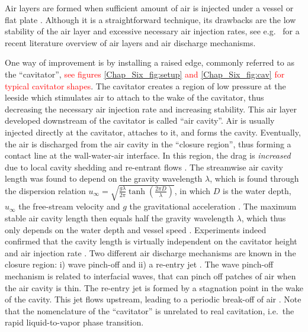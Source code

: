 \documentclass[aps,onecolumn,10pt, floatfix, superscriptaddress,longbibliography, pra]{revtex4-1}
\newcommand{\red}[1]{\textcolor{red}{#1}}
\begin{document}
Air layers are formed when sufficient amount of air is injected under a vessel or flat plate \citep{san06, elbing2008}. Although it is a straightforward technique, its drawbacks are the low stability of the air layer and excessive necessary air injection rates, see e.g.\ \citet{Zverkhovskyi2014} for a recent literature overview of air layers and air discharge mechanisms. 

One way of improvement is by installing a raised edge, commonly referred to as the ``cavitator'', \red{see figures \ref{Chap_Six_fig:setup} and \ref{Chap_Six_fig:cav} for typical cavitator shapes}.  The cavitator creates a region of low pressure at the leeside which stimulates air to attach to the wake of the cavitator, thus decreasing the necessary air injection rate and increasing stability. This air layer developed downstream of the cavitator is called ``air cavity''. Air is usually injected directly at the cavitator, attaches to it, and forms the cavity. Eventually, the air is discharged from the air cavity in the ``closure region'', thus forming a contact line at the wall-water-air interface. In this region, the drag is {\it increased} due to local cavity shedding and re-entrant flows \citep{cec10}. The streamwise air cavity length was found to depend on the gravity wavelength $\lambda$, which is found through the dispersion relation $u_{\infty} = \sqrt{\frac{g \lambda}{2 \pi} \tanh(\frac{2 \pi D}{\lambda})}$, in which $D$ is the water depth, $u_{\infty}$ the free-stream velocity and $g$ the gravitational acceleration  \citep{butuzov1967, matveev2003,matveev2005}. The maximum stable air cavity length then equals half the gravity wavelength $\lambda$, which thus only depends on the water depth and vessel speed . Experiments indeed confirmed that the cavity length is virtually independent on the cavitator height and air injection rate \citep{Zverkhovskyi2014}.  Two different air discharge mechanisms are known in the closure region: i) wave pinch-off and ii) a re-entry jet \citep{cec10}. The wave pinch-off mechanism is related to interfacial waves, that can pinch off patches of air when the air cavity is thin. The re-entry jet is formed by a stagnation point in the wake of the cavity. This jet flows upstream, leading to a periodic break-off of air \citep{Makiharju2013}. Note that the nomenclature of the ``cavitator''  is unrelated to real cavitation, i.e.\ the rapid liquid-to-vapor phase transition.  
\end{document}

